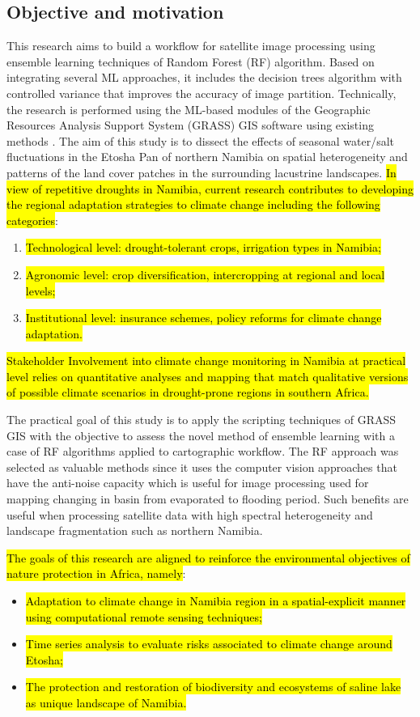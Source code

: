\documentclass[climate,article,submit,pdftex,moreauthors]{Definitions/mdpi}
\begin{document}
{\subsection{Objective and motivation}

This research aims to build a workflow for satellite image processing using ensemble learning techniques of Random Forest (RF) algorithm. Based on integrating several ML approaches, it includes the decision trees algorithm with controlled variance that improves the accuracy of image partition. Technically, the research is performed using the ML-based modules of the Geographic Resources Analysis Support System (GRASS) GIS software using existing methods \cite{lemenkova2025automation}. The aim of this study is to dissect the effects of seasonal water/salt fluctuations in the Etosha Pan of northern Namibia on spatial heterogeneity and patterns of the land cover patches in the surrounding lacustrine landscapes. \hl{In view of repetitive droughts in Namibia, current research contributes to developing the regional adaptation strategies to climate change including the following categories}: 
\begin{enumerate}
	\item \hl{Technological level: drought-tolerant crops, irrigation types in Namibia;}
	\item \hl{Agronomic level: crop diversification, intercropping at regional and local levels;}
	\item \hl{Institutional level: insurance schemes, policy reforms for climate change adaptation.}
\end{enumerate}
\hl{Stakeholder Involvement into climate change monitoring in Namibia at practical level relies on quantitative analyses and mapping that match qualitative versions of possible climate scenarios in drought-prone regions in southern Africa.}

The {practical }goal of this study is to apply the scripting techniques of GRASS GIS with the objective to assess the novel method of ensemble learning with a case of RF algorithms applied to cartographic workflow. The RF approach was selected as valuable methods since it uses the computer vision approaches that have the anti-noise capacity which is useful for image processing used for mapping changing in basin from evaporated to flooding period. Such benefits are useful when processing satellite data with high spectral heterogeneity and landscape fragmentation such as northern Namibia. 

\hl{The goals of this research are aligned to reinforce the environmental objectives of nature protection in Africa, namely}: 
\begin{itemize}
	\item[i] \hl{Adaptation to climate change in Namibia region in a spatial-explicit manner using computational remote sensing techniques;} 
	\item[ii] \hl{Time series analysis to evaluate risks associated to climate change around Etosha;} 
	\item[iii] \hl{The protection and restoration of biodiversity and ecosystems of saline lake as unique landscape of Namibia.}
\end{itemize}

}
\end{document}
